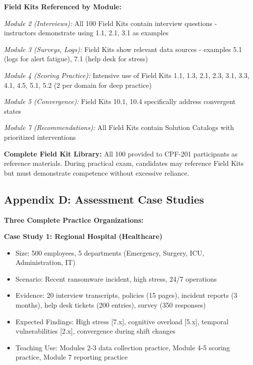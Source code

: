 \documentclass[11pt,a4paper]{article}
\begin{document}
\textbf{Field Kits Referenced by Module:}

\textit{Module 2 (Interviews):} All 100 Field Kits contain interview questions - instructors demonstrate using 1.1, 2.1, 3.1 as examples

\textit{Module 3 (Surveys, Logs):} Field Kits show relevant data sources - examples 5.1 (logs for alert fatigue), 7.1 (help desk for stress)

\textit{Module 4 (Scoring Practice):} Intensive use of Field Kits 1.1, 1.3, 2.1, 2.3, 3.1, 3.3, 4.1, 4.5, 5.1, 5.2 (2 per domain for deep practice)

\textit{Module 5 (Convergence):} Field Kits 10.1, 10.4 specifically address convergent states

\textit{Module 7 (Recommendations):} All Field Kits contain Solution Catalogs with prioritized interventions

\textbf{Complete Field Kit Library:} All 100 provided to CPF-201 participants as reference materials. During practical exam, candidates may reference Field Kits but must demonstrate competence without excessive reliance.

\subsection{Appendix D: Assessment Case Studies}

\textbf{Three Complete Practice Organizations:}

\textbf{Case Study 1: Regional Hospital (Healthcare)}
\begin{itemize}
\item Size: 500 employees, 5 departments (Emergency, Surgery, ICU, Administration, IT)
\item Scenario: Recent ransomware incident, high stress, 24/7 operations
\item Evidence: 20 interview transcripts, policies (15 pages), incident reports (3 months), help desk tickets (200 entries), survey (350 responses)
\item Expected Findings: High stress [7.x], cognitive overload [5.x], temporal vulnerabilities [2.x], convergence during shift changes
\item Teaching Use: Modules 2-3 data collection practice, Module 4-5 scoring practice, Module 7 reporting practice
\end{itemize}
\end{document}
